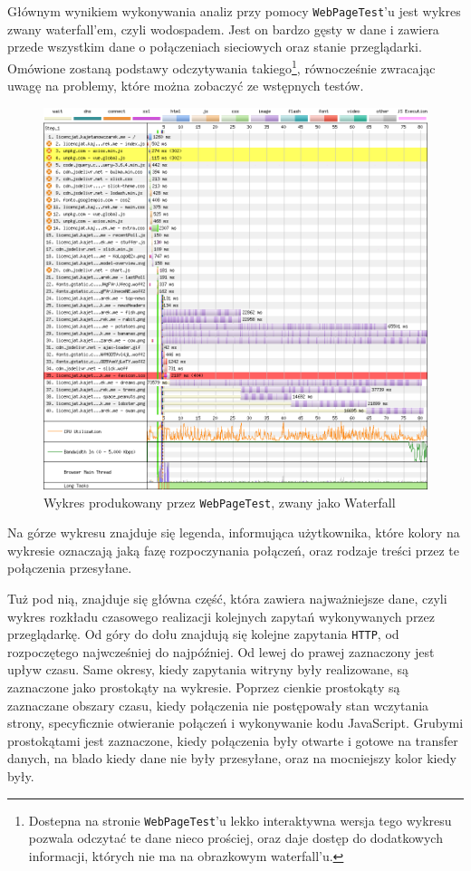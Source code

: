 \documentclass[licencjacka]{pracadypl}
\begin{document}
Głównym wynikiem wykonywania analiz przy pomocy \texttt{WebPageTest}'u jest wykres zwany waterfall'em, czyli wodospadem. Jest on bardzo gęsty w dane i zawiera przede wszystkim dane o połączeniach sieciowych oraz stanie przeglądarki. Omówione zostaną podstawy odczytywania takiego\footnote{Dostepna na stronie \texttt{WebPageTest}'u lekko interaktywna wersja tego wykresu pozwala odczytać te dane nieco prościej, oraz daje dostęp do dodatkowych informacji, których nie ma na obrazkowym waterfall'u.}, równocześnie zwracając uwagę na problemy, które można zobaczyć ze wstępnych testów.
\begin{figure}[h!]
  \includegraphics[width=\linewidth]{images/base-waterfall-all-final.png}
  \caption{Wykres produkowany przez \texttt{WebPageTest}, zwany jako Waterfall}
  \label{fig:waterfall-base}
\end{figure}
Na górze wykresu znajduje się legenda, informująca użytkownika, które kolory na wykresie oznaczają jaką fazę rozpoczynania połączeń, oraz rodzaje treści przez te połączenia przesyłane. 

Tuż pod nią, znajduje się główna część, która zawiera najważniejsze dane, czyli wykres rozkładu czasowego realizacji kolejnych zapytań wykonywanych przez przeglądarkę. Od góry do dołu znajdują się kolejne zapytania \texttt{HTTP}, od rozpoczętego najwcześniej do najpóźniej. Od lewej do prawej zaznaczony jest upływ czasu. Same okresy, kiedy zapytania witryny były realizowane, są zaznaczone jako prostokąty na wykresie. Poprzez cienkie prostokąty są zaznaczane obszary czasu, kiedy połączenia nie postępowały stan wczytania strony, specyficznie otwieranie połączeń i wykonywanie kodu JavaScript. Grubymi prostokątami jest zaznaczone, kiedy połączenia były otwarte i gotowe na transfer danych, na blado kiedy dane nie były przesyłane, oraz na mocniejszy kolor kiedy były.
\end{document}
